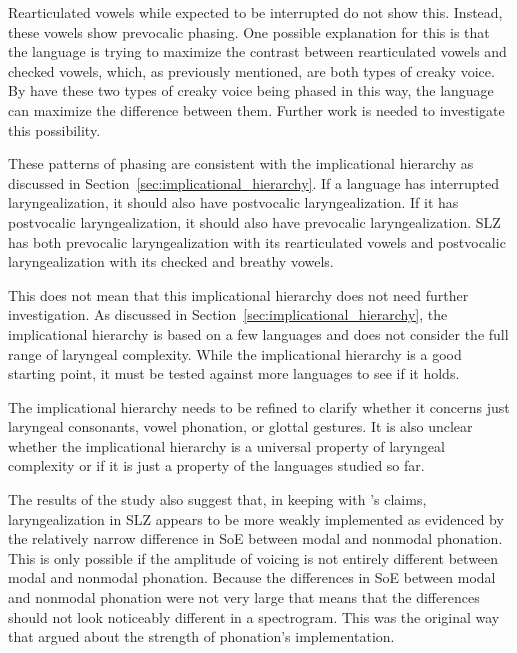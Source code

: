 Rearticulated vowels while expected to be interrupted do not show this. Instead, these vowels show prevocalic phasing. One possible explanation for this is that the language is trying to maximize the contrast between rearticulated vowels and checked vowels, which, as previously mentioned, are both types of creaky voice. By have these two types of creaky voice being phased in this way, the language can maximize the difference between them. Further work is needed to investigate this possibility. 

These patterns of phasing are consistent with the implicational hierarchy as discussed in Section~\ref{sec:implicational_hierarchy}. If a language  has interrupted laryngealization, it should also have postvocalic laryngealization. If it has postvocalic laryngealization, it should also have prevocalic laryngealization. SLZ has both prevocalic laryngealization with its rearticulated vowels and postvocalic laryngealization with its checked  and breathy vowels. 

This does not mean that this implicational hierarchy does not need further investigation. As discussed in Section~\ref{sec:implicational_hierarchy}, the implicational hierarchy is based on a few languages and does not consider the full range of laryngeal complexity. While the implicational hierarchy is a good starting point, it must be tested against more languages to see if it holds.

The implicational hierarchy needs to be refined to clarify whether it concerns just laryngeal consonants, vowel phonation, or glottal gestures. It is also unclear whether the implicational hierarchy is a universal property of laryngeal complexity or if it is just a property of the languages studied so far.

The results of the study also suggest that, in keeping with \citeauthor{silvermanLaryngealComplexityOtomanguean1997}'s \citeyear{silvermanLaryngealComplexityOtomanguean1997} claims, laryngealization in SLZ appears to be more weakly implemented as evidenced by the relatively narrow difference in SoE between modal and nonmodal phonation. This is only possible if the amplitude of voicing is not entirely different between modal and nonmodal phonation. Because the differences in SoE between modal and nonmodal phonation were not very large that means that the differences should not look noticeably different in a spectrogram. This was the original way that \citet{silvermanLaryngealComplexityOtomanguean1997,herrerazendejasAmuzgoZapotecTwo2000} argued about the strength of phonation's implementation. 

